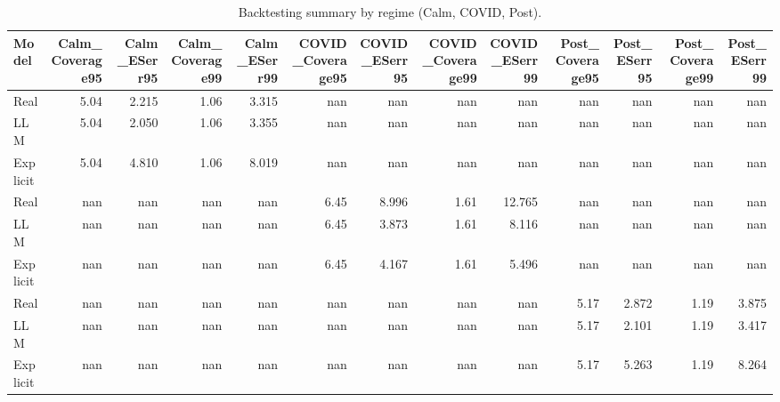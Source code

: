 \begin{table}[htbp]
\centering
\caption{Backtesting summary by regime (Calm, COVID, Post).}
\begin{tabular}{lrrrrrrrrrrrr}
\toprule
Model & Calm_Coverage95 & Calm_ESerr95 & Calm_Coverage99 & Calm_ESerr99 & COVID_Coverage95 & COVID_ESerr95 & COVID_Coverage99 & COVID_ESerr99 & Post_Coverage95 & Post_ESerr95 & Post_Coverage99 & Post_ESerr99 \\
\midrule
Real & 5.04 & 2.215 & 1.06 & 3.315 & nan & nan & nan & nan & nan & nan & nan & nan \\
LLM & 5.04 & 2.050 & 1.06 & 3.355 & nan & nan & nan & nan & nan & nan & nan & nan \\
Explicit & 5.04 & 4.810 & 1.06 & 8.019 & nan & nan & nan & nan & nan & nan & nan & nan \\
Real & nan & nan & nan & nan & 6.45 & 8.996 & 1.61 & 12.765 & nan & nan & nan & nan \\
LLM & nan & nan & nan & nan & 6.45 & 3.873 & 1.61 & 8.116 & nan & nan & nan & nan \\
Explicit & nan & nan & nan & nan & 6.45 & 4.167 & 1.61 & 5.496 & nan & nan & nan & nan \\
Real & nan & nan & nan & nan & nan & nan & nan & nan & 5.17 & 2.872 & 1.19 & 3.875 \\
LLM & nan & nan & nan & nan & nan & nan & nan & nan & 5.17 & 2.101 & 1.19 & 3.417 \\
Explicit & nan & nan & nan & nan & nan & nan & nan & nan & 5.17 & 5.263 & 1.19 & 8.264 \\
\bottomrule
\end{tabular}
\end{table}
